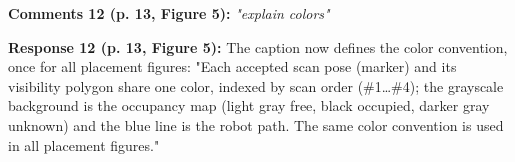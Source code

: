 \documentclass[11pt]{article}
\begin{document}
\medskip

\textbf{Comments 12 (p. 13, Figure 5):} \emph{"explain colors"}

\textbf{Response 12 (p. 13, Figure 5):} The caption now defines the color convention, once for all placement figures: "Each accepted scan pose (marker) and its visibility polygon share one color, indexed by scan order (\#1…\#4); the grayscale background is the occupancy map (light gray free, black occupied, darker gray unknown) and the blue line is the robot path. The same color convention is used in all placement figures."

\medskip
\end{document}
